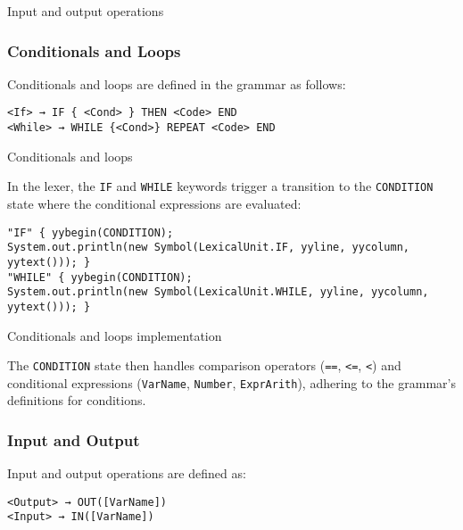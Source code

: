     \begin{table}[h]
		\centering
		\caption{Input and output operations}
	\end{table}

	\subsubsection{Conditionals and Loops}
	Conditionals and loops are defined in the grammar as follows:

	\begin{verbatim}
<If> → IF { <Cond> } THEN <Code> END
<While> → WHILE {<Cond>} REPEAT <Code> END
	\end{verbatim}

    \begin{table}[h]
		\centering
		\caption{Conditionals and loops}
	\end{table}

	In the lexer, the \texttt{IF} and \texttt{WHILE} keywords trigger a transition to the \texttt{CONDITION} state where the conditional expressions are evaluated:

	\begin{verbatim}
"IF" { yybegin(CONDITION);
System.out.println(new Symbol(LexicalUnit.IF, yyline, yycolumn, yytext())); }
"WHILE" { yybegin(CONDITION);
System.out.println(new Symbol(LexicalUnit.WHILE, yyline, yycolumn, yytext())); }
	\end{verbatim}

    \begin{table}[h]
		\centering
		\caption{Conditionals and loops implementation}
	\end{table}

	The \texttt{CONDITION} state then handles comparison operators (\texttt{==}, \texttt{<=}, \texttt{<}) and conditional expressions (\texttt{VarName}, \texttt{Number}, \texttt{ExprArith}), adhering to the grammar's definitions for conditions.

	\subsubsection{Input and Output}
	Input and output operations are defined as:

	\begin{verbatim}
<Output> → OUT([VarName])
<Input> → IN([VarName])
	\end{verbatim}

